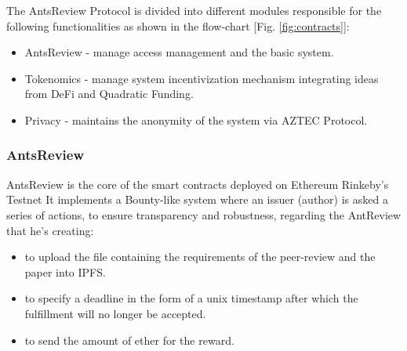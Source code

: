 \documentclass[runningheads]{llncs}
\begin{document}
The AntsReview Protocol is divided into different modules responsible for the following functionalities as shown in the flow-chart [Fig. \ref{fig:contracts}]:

\begin{itemize}
\item AntsReview - manage access management and the basic system.
\item Tokenomics - manage system incentivization mechanism integrating ideas from DeFi and Quadratic Funding.
\item Privacy - maintains the anonymity of the system via AZTEC Protocol.
\end{itemize}

\subsubsection{AntsReview}

AntsReview \cite{Ant} is the core of the smart contracts deployed on Ethereum Rinkeby's Testnet \cite{Rinkeby}
\newline It implements a Bounty-like system where an issuer (author) is asked a series of actions, to ensure transparency and robustness, regarding the AntReview that he's creating:
\begin{itemize}
  \item to upload the file containing the requirements of the peer-review and the paper into IPFS\cite{IPFS}.
  \item to specify a deadline in the form of a unix timestamp after which the fulfillment will no longer be accepted.
  \item to send the amount of ether for the reward.
\end{itemize}
\end{document}
